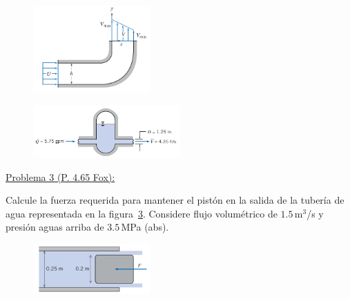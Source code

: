 \documentclass[11pt]{report}
\begin{document}
\begin{multicols}{2}
\begin{center}
\begin{figure}[H]
\centering\includegraphics[width=0.4\textwidth]{Figures/p1.png}
\caption{\label{fig:fig1} }
\end{figure}
\columnbreak
\vspace*{\fill}
\begin{figure}[H]
\centering\includegraphics[width=0.5\textwidth]{Figures/p2.png}
\caption{\label{fig:fig2}}
\end{figure}
\end{center}
\end{multicols}


\newpage
\vspace{1cm}

\underline {Problema 3 (P. 4.65 Fox):}

\vspace{0.2cm}

Calcule la fuerza requerida para mantener el pist\'on en la salida de la tuber\'ia de agua representada en la figura~\ref{fig:fig3}. Considere flujo volum\'etrico de $1.5$\,m$^3$/s y presi\'on aguas arriba de $3.5$\,MPa (abs).


\begin{figure}[H]
\vfill

\centering\includegraphics[width=0.4\textwidth]{Figures/p3.png}
\caption{\label{fig:fig3} }
\end{figure}
\end{document}
